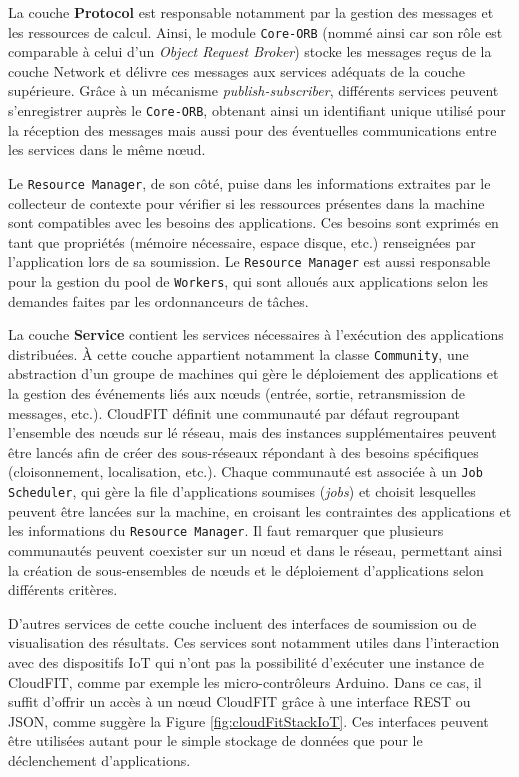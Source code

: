 La couche \textbf{Protocol} est responsable notamment par la gestion des messages et les ressources de calcul. Ainsi, le module \texttt{Core-ORB} (nommé ainsi car son rôle est comparable à celui d'un \textit{Object Request Broker}) stocke les messages reçus de la couche Network et délivre ces messages aux services adéquats de la couche supérieure. Grâce à un mécanisme \textit{publish-subscriber}, différents services peuvent s'enregistrer auprès le \texttt{Core-ORB}, obtenant ainsi un identifiant unique utilisé pour la réception des messages mais aussi pour des éventuelles communications entre les services dans le même n{\oe}ud. 

Le \texttt{Resource Manager}, de son côté, puise dans les informations extraites par le collecteur de contexte pour vérifier si les ressources présentes dans la machine sont compatibles avec les besoins des applications. Ces besoins sont exprimés en tant que propriétés (mémoire nécessaire, espace disque, etc.) renseignées par l'application lors de sa soumission. Le \texttt{Resource Manager} est aussi responsable pour la gestion du pool de \texttt{Workers}, qui sont alloués aux applications selon les demandes faites par les ordonnanceurs de tâches. 

La couche \textbf{Service}  contient les services nécessaires à l'exécution des applications distribuées. À cette couche appartient notamment la classe \texttt{Community}, une abstraction d'un groupe de machines qui gère le déploiement des applications et la gestion des événements liés aux n{\oe}uds (entrée, sortie, retransmission de messages, etc.). CloudFIT définit une communauté par défaut regroupant l'ensemble des n{\oe}uds sur lé réseau, mais des instances supplémentaires peuvent être lancés afin de créer des sous-réseaux répondant à des besoins spécifiques (cloisonnement, localisation, etc.). Chaque communauté est associée à un \texttt{Job Scheduler}, qui gère la file d'applications soumises (\textit{jobs}) et choisit lesquelles peuvent être lancées sur la machine, en croisant les contraintes des applications et les informations du \texttt{Resource Manager}.  Il faut remarquer que plusieurs communautés peuvent coexister sur un n{\oe}ud et dans le réseau, permettant ainsi la création de sous-ensembles de n{\oe}uds et le déploiement d'applications selon différents critères. 

 D'autres services de cette couche incluent des interfaces de soumission ou de visualisation des résultats. Ces services sont notamment utiles dans l'interaction avec des dispositifs IoT qui n'ont pas la possibilité d'exécuter une instance de CloudFIT, comme par exemple les micro-contrôleurs Arduino. Dans ce cas, il suffit d'offrir un accès à un n{\oe}ud CloudFIT grâce à une interface REST ou JSON, comme suggère la Figure \ref{fig:cloudFitStackIoT}. Ces interfaces peuvent être utilisées autant pour le simple stockage de données que pour le déclenchement d'applications.

